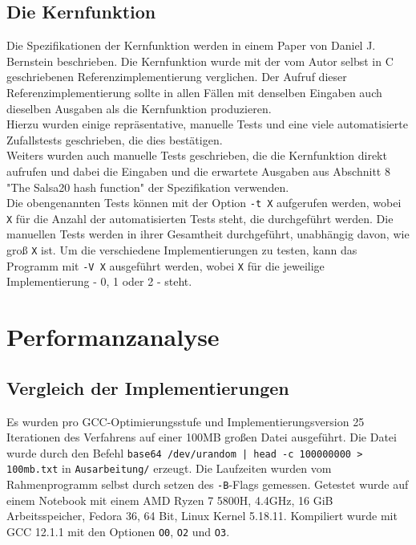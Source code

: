\documentclass[course=erap]{aspdoc}
\begin{document}
\subsection{Die Kernfunktion}
Die Spezifikationen der Kernfunktion werden in einem Paper von Daniel J. Bernstein beschrieben. \cite{salsa20specification}
Die Kernfunktion wurde mit der vom Autor selbst in C geschriebenen Referenzimplementierung verglichen. \cite{salsa20}
Der Aufruf dieser Referenzimplementierung sollte in allen Fällen mit denselben Eingaben auch dieselben Ausgaben
als die Kernfunktion produzieren. 
\\Hierzu wurden einige repräsentative, manuelle Tests und eine viele automatisierte Zufallstests 
geschrieben, die dies bestätigen.
\\Weiters wurden auch manuelle Tests geschrieben, die die Kernfunktion direkt aufrufen und dabei 
die Eingaben und die erwartete Ausgaben aus Abschnitt 8 "The Salsa20 hash function" der Spezifikation 
verwenden. \cite{salsa20specification}
\\Die obengenannten Tests können mit der Option \texttt{-t X} aufgerufen werden, wobei \texttt{X} für die Anzahl der automatisierten 
Tests steht, die durchgeführt werden. Die manuellen Tests werden in ihrer Gesamtheit durchgeführt, unabhängig davon, 
wie groß \texttt{X} ist. Um die verschiedene Implementierungen zu testen, kann das Programm mit \texttt{-V X} ausgeführt werden, 
wobei \texttt{X} für die jeweilige Implementierung - 0, 1 oder 2 - steht.


\section{Performanzanalyse} \label{perf}
\subsection{Vergleich der Implementierungen}
Es wurden pro GCC-Optimierungsstufe und Implementierungsversion 25 
Iterationen des Verfahrens auf einer 100MB großen Datei ausgeführt. Die Datei
wurde durch den Befehl \texttt{base64 /dev/urandom | head -c 100000000 > 100mb.txt}
in \texttt{Ausarbeitung/} erzeugt.
Die Laufzeiten wurden vom Rahmenprogramm selbst durch setzen des \texttt{-B}-Flags
gemessen. Getestet wurde auf einem Notebook mit einem AMD Ryzen 7 5800H, 
4.4GHz, 16 GiB Arbeitsspeicher, Fedora 36, 64 Bit, Linux Kernel 5.18.11.
Kompiliert wurde mit GCC 12.1.1 mit den Optionen \texttt{O0}, \texttt{O2} und \texttt{O3}.
\end{document}
